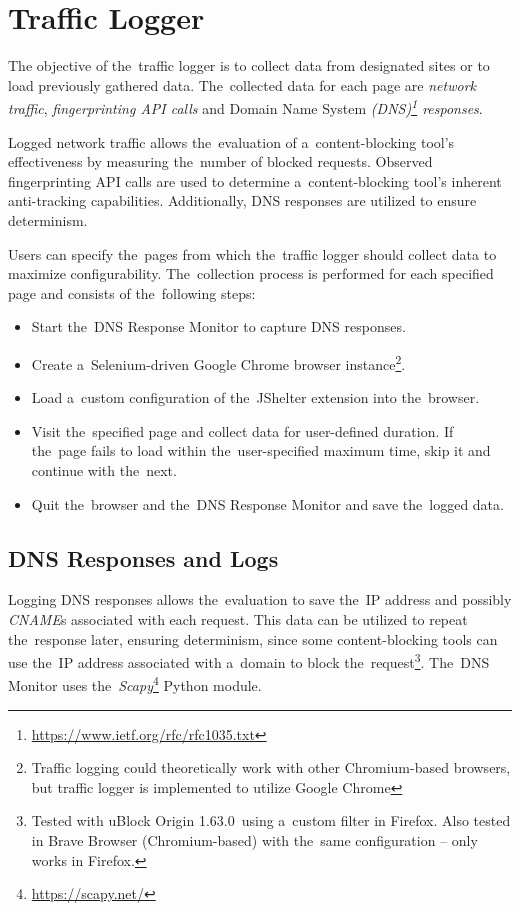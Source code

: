 \section{Traffic Logger}

The objective of the~traffic logger is to collect data from designated sites or to load previously gathered data. The~collected data for each page are \textit{network traffic}, \textit{fingerprinting API calls} and Domain Name System \textit{(DNS)\footnote{\url{https://www.ietf.org/rfc/rfc1035.txt}} responses}.

Logged network traffic allows the~evaluation of a~content-blocking tool's effectiveness by measuring the~number of blocked requests. Observed fingerprinting API calls are used to determine a~content-blocking tool's inherent anti-tracking capabilities. Additionally, DNS responses are utilized to ensure determinism.

Users can specify the~pages from which the~traffic logger should collect data to maximize configurability. The~collection process is performed for each specified page and consists of the~following steps:

\begin{itemize}
\setlength\itemsep{0em}
\item Start the~DNS Response Monitor to capture DNS responses.
\item Create a~Selenium-driven Google Chrome browser instance\footnote{Traffic logging could theoretically work with other Chromium-based browsers, but traffic logger is implemented to utilize Google Chrome}.
\item Load a~custom configuration of the~JShelter extension into the~browser.
\item Visit the~specified page and collect data for user-defined duration. If the~page fails to load within the~user-specified maximum time, skip it and continue with the~next.
\item Quit the~browser and the~DNS Response Monitor and save the~logged data.

\end{itemize}

\subsection{DNS Responses and Logs}
Logging DNS responses allows the~evaluation to save the~IP address and possibly \textit{CNAME}s associated with each request. This data can be utilized to repeat the~response later, ensuring determinism, since some content-blocking tools can use the~IP address associated with a~domain to block the~request\footnote{Tested with uBlock Origin 1.63.0~using a~custom filter in Firefox. Also tested in Brave Browser (Chromium-based) with the~same configuration -- only works in Firefox.}. The~DNS Monitor uses the~\textit{Scapy}\footnote{\url{https://scapy.net/}} Python module.

